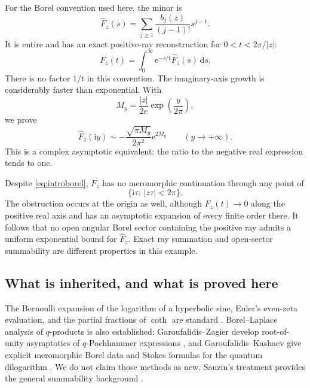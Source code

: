 \documentclass[11pt,a4paper]{article}
\numberwithin{equation}{section}
\theoremstyle{definition}
\theoremstyle{remark}
\newcommand{\ii}{\mathrm i}
\newcommand{\e}{\mathrm e}
\newcommand{\dd}{\,\mathrm d}
\begin{document}
For the Borel convention used here, the minor is
\begin{equation}
 \widehat F_z(s)=\sum_{j\ge1}\frac{b_j(z)}{(j-1)!}s^{j-1}.
 \label{eq:introborel}
\end{equation}
It is entire and has an exact positive-ray reconstruction for $0<t<2\pi/|z|$:
\begin{equation}
 F_z(t)=\int_0^\infty\e^{-s/t}\widehat F_z(s)\dd s.
 \label{eq:introlap}
\end{equation}
There is no factor $1/t$ in this convention. The imaginary-axis growth is considerably faster than exponential. With
\begin{equation}
 M_y=\frac{|z|}{2e}\exp\!\left(\frac{y}{2\pi}\right),
 \label{eq:introM}
\end{equation}
we prove
\begin{equation}
 \widehat F_z(\ii y)\sim
 -\frac{\sqrt{\pi M_y}}{2\pi^2}\e^{2M_y}
 \qquad(y\to+\infty).
 \label{eq:introimag}
\end{equation}
This is a complex asymptotic equivalent: the ratio to the negative real expression tends to one.

Despite \eqref{eq:introborel}, $F_z$ has no meromorphic continuation through any point of
\begin{equation}
 \{\ii\tau:\ |z\tau|<2\pi\}.
 \label{eq:barrierinterval}
\end{equation}
The obstruction occurs at the origin as well, although $F_z(t)\to0$ along the positive real axis and has an asymptotic expansion of every finite order there. It follows that no open angular Borel sector containing the positive ray admits a uniform exponential bound for $\widehat F_z$. Exact ray summation and open-sector summability are different properties in this example.

\subsection{What is inherited, and what is proved here}
The Bernoulli expansion of the logarithm of a hyperbolic sine, Euler's even-zeta evaluation, and the partial fractions of $\coth$ are standard \cite{dlmf}. Borel--Laplace analysis of $q$-products is also established: Garoufalidis--Zagier develop root-of-unity asymptotics of $q$-Pochhammer expressions \cite{gz}, and Garoufalidis--Kashaev give explicit meromorphic Borel data and Stokes formulas for the quantum dilogarithm \cite{gk}. We do not claim those methods as new. Sauzin's treatment provides the general summability background \cite{sauzin}.
\end{document}

